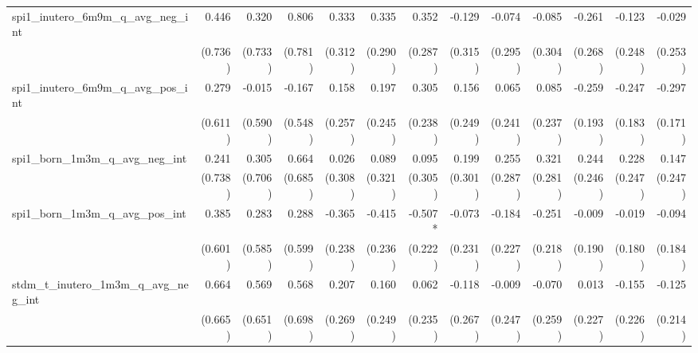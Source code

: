 \begin{tabular}{lrrrrrrrrrrrr}
spi1\_inutero\_6m9m\_q\_avg\_neg\_int       &        0.446 &        0.320 &        0.806 &        0.333 &        0.335 &        0.352 &       -0.129 &       -0.074 &       -0.085 &       -0.261 &       -0.123 &       -0.029 \\ 
                                            &      (0.736) &      (0.733) &      (0.781) &      (0.312) &      (0.290) &      (0.287) &      (0.315) &      (0.295) &      (0.304) &      (0.268) &      (0.248) &      (0.253) \\ 
spi1\_inutero\_6m9m\_q\_avg\_pos\_int       &        0.279 &       -0.015 &       -0.167 &        0.158 &        0.197 &        0.305 &        0.156 &        0.065 &        0.085 &       -0.259 &       -0.247 &       -0.297 \\ 
                                            &      (0.611) &      (0.590) &      (0.548) &      (0.257) &      (0.245) &      (0.238) &      (0.249) &      (0.241) &      (0.237) &      (0.193) &      (0.183) &      (0.171) \\ 
spi1\_born\_1m3m\_q\_avg\_neg\_int          &        0.241 &        0.305 &        0.664 &        0.026 &        0.089 &        0.095 &        0.199 &        0.255 &        0.321 &        0.244 &        0.228 &        0.147 \\ 
                                            &      (0.738) &      (0.706) &      (0.685) &      (0.308) &      (0.321) &      (0.305) &      (0.301) &      (0.287) &      (0.281) &      (0.246) &      (0.247) &      (0.247) \\ 
spi1\_born\_1m3m\_q\_avg\_pos\_int          &        0.385 &        0.283 &        0.288 &       -0.365 &       -0.415 &      -0.507* &       -0.073 &       -0.184 &       -0.251 &       -0.009 &       -0.019 &       -0.094 \\ 
                                            &      (0.601) &      (0.585) &      (0.599) &      (0.238) &      (0.236) &      (0.222) &      (0.231) &      (0.227) &      (0.218) &      (0.190) &      (0.180) &      (0.184) \\ 
stdm\_t\_inutero\_1m3m\_q\_avg\_neg\_int    &        0.664 &        0.569 &        0.568 &        0.207 &        0.160 &        0.062 &       -0.118 &       -0.009 &       -0.070 &        0.013 &       -0.155 &       -0.125 \\ 
                                            &      (0.665) &      (0.651) &      (0.698) &      (0.269) &      (0.249) &      (0.235) &      (0.267) &      (0.247) &      (0.259) &      (0.227) &      (0.226) &      (0.214) \\ 

\end{tabular}
